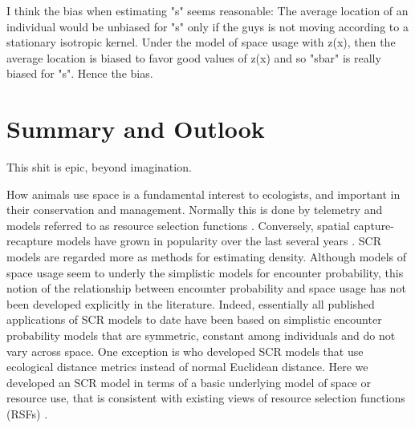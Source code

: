 I think the bias when estimating "s" seems reasonable: The average
location of an individual would be unbiased for "s" only if the guys
is not moving according to a stationary isotropic kernel. Under the
model of space usage with z(x), then the average location is biased to
favor good values of z(x) and so "sbar" is really biased for
"s". Hence the bias.


\section{Summary and Outlook}

This shit is epic, beyond imagination.


How animals use space is a fundamental interest to ecologists, and
important in their conservation and management. Normally this is done
by telemetry and models referred to as resource selection functions
\citep{manly_etal:2002}.  Conversely, spatial capture-recapture models
have grown in popularity over the last several years
\citep{efford:2004,borchers_efford:2008, royle:2008, efford_etal:2009ecol,royle_etal:2009ecol,
  gardner_etal:2010, gardner_etal:2011, kery_etal:2010,
sollmann_etal:2011,mollet_etal:2012,gopalaswmany_etal:2012}. 
  SCR models are regarded
more as methods for estimating density. Although models of space usage
seem to underly the simplistic models for encounter probability, this
notion of the relationship between encounter probability and space
usage has not been developed explicitly in the literature.  Indeed,
essentially all published applications of SCR models to date have been
based on simplistic encounter probability models that are symmetric,
constant among individuals and do not vary across space. One exception
is \citet{royle_etal:2012ecol} who developed SCR models that use
ecological distance metrics instead of normal Euclidean distance. Here
we developed an SCR model in terms of a basic underlying model of
space or resource use, that is consistent with existing views of
resource selection functions (RSFs) \citep{manly_etal:2002}.

